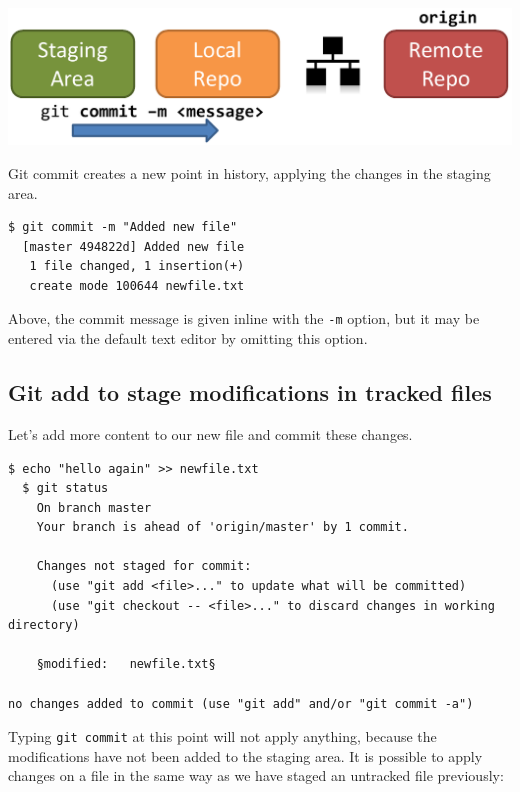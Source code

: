 \documentclass{../../common/tufte-latex/tufte-handout}
\begin{document}
\begin{marginfigure}%
  \centering
  \includegraphics[width=\linewidth]{gitcommit-schema.pdf}
  \label{fig:gitcommit}
  \caption{Git commit creates a new point in history, applying the changes in the staging area.}
\end{marginfigure}

\begin{lstlisting}[style=BashInputStyle]
  $ git commit -m "Added new file"
  [master 494822d] Added new file
   1 file changed, 1 insertion(+)
   create mode 100644 newfile.txt
\end{lstlisting}

Above, the commit message is given inline with the \texttt{-m} option, but it may be entered via the default text editor by omitting this option.

\subsection{Git add to stage modifications in tracked files}

Let's add more content to our new file and commit these changes.

\begin{lstlisting}[style=BashInputStyle]
  $ echo "hello again" >> newfile.txt
  $ git status
    On branch master
    Your branch is ahead of 'origin/master' by 1 commit.
  
    Changes not staged for commit:
      (use "git add <file>..." to update what will be committed)
      (use "git checkout -- <file>..." to discard changes in working directory)
   
    §modified:   newfile.txt§
   
no changes added to commit (use "git add" and/or "git commit -a")
\end{lstlisting}

Typing \texttt{git commit} at this point will not apply anything, because the modifications have not been added to the staging area.
It is possible to apply changes on a file in the same way as we have staged an untracked file previously:
\end{document}
